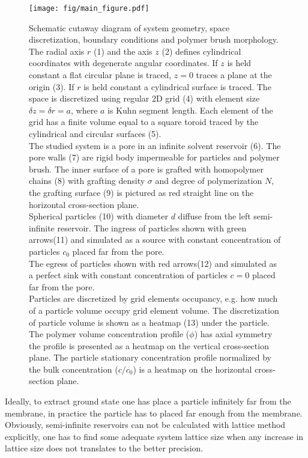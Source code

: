\documentclass[12pt, a4paper]{article}
\begin{document}
\begin{figure}
    \centering
    \texttt{[image: fig/main\_figure.pdf]}
    \caption{Schematic cutaway diagram of system geometry, space discretization, boundary conditions and polymer brush morphology.
    The radial axis $r$ (1) and the axis $z$ (2) defines cylindrical coordinates with degenerate angular coordinates.
    If $z$ is held constant a flat circular plane is traced, $z=0$ traces a plane at the origin (3). 
    If $r$ is held constant a cylindrical surface is traced.
    The space is discretized using regular 2D grid (4) with element size $\delta z = \delta r = a$, where $a$ is Kuhn segment length.
    Each element of the grid has a finite volume equal to a square toroid traced by the cylindrical and circular surfaces (5).
    \\
    The studied system is a pore in an infinite solvent reservoir (6).
    The pore walls (7) are rigid body impermeable for particles and polymer brush. The inner surface of a pore is grafted with homopolymer chains (8) with grafting density $\sigma$ and degree of polymerization $N$, 
    the grafting surface (9) is pictured as red straight line on the horizontal cross-section plane.
    \\
    Spherical particles (10) with diameter $d$ diffuse from the left semi-infinite reservoir. 
    The ingress of particles shown with green arrows(11) and simulated as a source with constant concentration of particles $c_0$ placed far from the pore.
    \\
    The egress of particles shown with red arrows(12) and simulated as a perfect sink with constant concentration of particles $c=0$ placed far from the pore.
    \\
    Particles are discretized by grid elements occupancy, e.g. how much of a particle volume occupy grid element volume. The discretization of particle volume is shown as a heatmap (13) under the particle.  
    \\
    The polymer volume concentration profile ($\phi$) has axial symmetry the profile is presented as a heatmap on the vertical cross-section plane. 
    The particle stationary concentration profile normalized by the bulk concentration ($c/c_0$) is a heatmap on the horizontal cross-section plane.}
    \label{fig:main_discretization}
\end{figure}

Ideally, to extract ground state one has place a particle infinitely far from the membrane, in practice the particle has to placed far enough from the membrane.
Obviously, semi-infinite reservoirs can not be calculated with lattice method explicitly, one has to find some adequate system lattice size when any increase in lattice size does not translates to the better precision.
\end{document}

